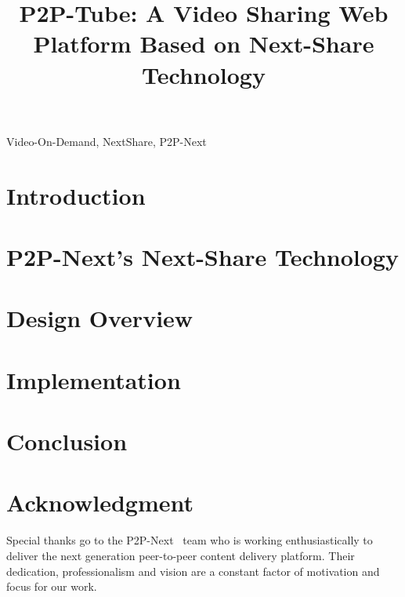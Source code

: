\documentclass[conference]{IEEEtran}
\begin{document}
\title{P2P-Tube: A Video Sharing Web Platform Based on Next-Share Technology}

\author{
}

\maketitle

\begin{abstract}

\end{abstract}


\begin{IEEEkeywords}
Video-On-Demand, NextShare, P2P-Next
\end{IEEEkeywords}


\section{Introduction}
\label{sec:introduction}


\section{P2P-Next's Next-Share Technology}
\label{sec:next-share}


\section{Design Overview}
\label{sec:design}


\section{Implementation}
\label{sec:implementation}


\section{Conclusion}
\label{sec:conclusion}


\section*{Acknowledgment}
\label{sec:acknowledgment}

Special thanks go to the P2P-Next~\cite{p2p-next} team who is working
enthusiastically to deliver the next generation peer-to-peer content delivery
platform. Their dedication, professionalism and vision are a constant factor
of motivation and focus for our work.



\end{document}

